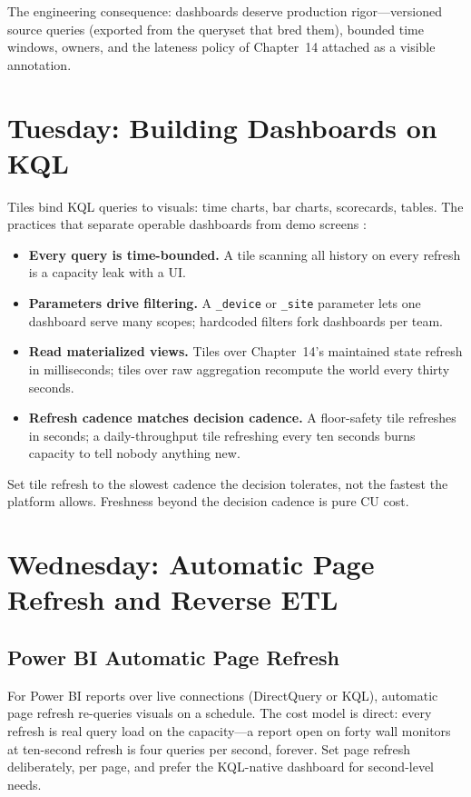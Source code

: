 The engineering consequence: dashboards deserve production rigor---versioned source queries (exported from the queryset that bred them), bounded time windows, owners, and the lateness policy of Chapter~14 attached as a visible annotation.

\section{Tuesday: Building Dashboards on KQL}
Tiles bind KQL queries to visuals: time charts, bar charts, scorecards, tables. The practices that separate operable dashboards from demo screens \cite{microsoftRealTimeDashboards}:

\begin{itemize}
    \item \textbf{Every query is time-bounded.} A tile scanning all history on every refresh is a capacity leak with a UI.
    \item \textbf{Parameters drive filtering.} A \texttt{\_device} or \texttt{\_site} parameter lets one dashboard serve many scopes; hardcoded filters fork dashboards per team.
    \item \textbf{Read materialized views.} Tiles over Chapter~14's maintained state refresh in milliseconds; tiles over raw aggregation recompute the world every thirty seconds.
    \item \textbf{Refresh cadence matches decision cadence.} A floor-safety tile refreshes in seconds; a daily-throughput tile refreshing every ten seconds burns capacity to tell nobody anything new.
\end{itemize}

\begin{tipbox}
Set tile refresh to the slowest cadence the decision tolerates, not the fastest the platform allows. Freshness beyond the decision cadence is pure CU cost.
\end{tipbox}

\section{Wednesday: Automatic Page Refresh and Reverse ETL}
\subsection{Power BI Automatic Page Refresh}
For Power BI reports over live connections (DirectQuery or KQL), automatic page refresh re-queries visuals on a schedule. The cost model is direct: every refresh is real query load on the capacity---a report open on forty wall monitors at ten-second refresh is four queries per second, forever. Set page refresh deliberately, per page, and prefer the KQL-native dashboard for second-level needs.

